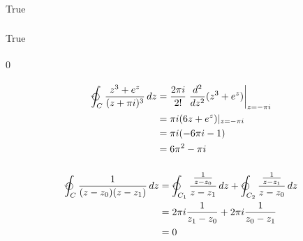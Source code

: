 \documentclass{article}
\begin{document}
\subsubsection{}

True

\setcounter{subsubsection}{2}
\subsubsection{}

True

\setcounter{subsubsection}{4}
\subsubsection{}

$0$

\setcounter{subsubsection}{6}
\subsubsection{}

\begin{align*}
  \varointctrclockwise_C \frac{z^3 + e^z}{(z + \pi i)^3} \,d z & = \frac{2 \pi i}{2!} \left. \frac{d^2}{d z^2} (z^3 + e^z) \right|_{z = -\pi i} \\
                                                               & = \pi i (6 z + e^z)|_{z = -\pi i}                                              \\
                                                               & = \pi i (-6 \pi i - 1)                                                         \\
                                                               & = 6 \pi^2 - \pi i
\end{align*}

\setcounter{subsubsection}{8}
\subsubsection{}

\begin{align*}
  \varointctrclockwise_C \frac{1}{(z - z_0) (z - z_1)} \,d z & = \varointctrclockwise_{C_1} \frac{\frac{1}{z - z_0}}{z - z_1} \,d z + \varointctrclockwise_{C_2} \frac{\frac{1}{z - z_1}}{z - z_0} \,d z \\
                                                             & = 2 \pi i \frac{1}{z_1 - z_0} + 2 \pi i \frac{1}{z_0 - z_1}                                                                               \\
                                                             & = 0
\end{align*}
\end{document}

